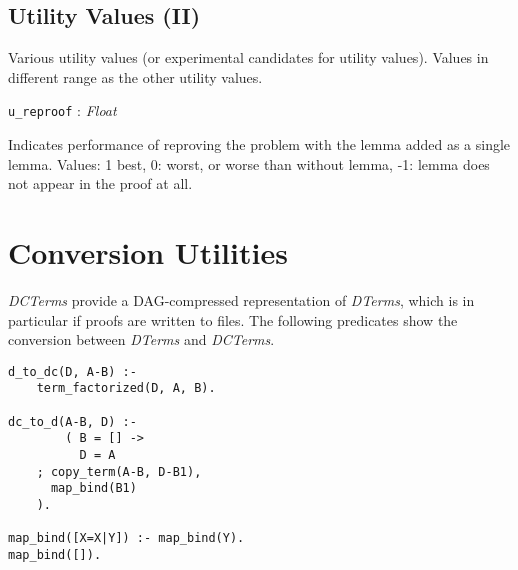 \documentclass[a4paper,11pt]{article}
\newcommand{\f}[1]{\texttt{#1}}
\newcommand{\var}[1]{\textnormal{\textit{#1}}}
\newcommand{\lit}[1]{\textnormal{\textit{#1}}}
\newcommand{\propsig}[2]
{\noindent \f{#1} : #2}
\newcommand{\propdesc}[1]
{\par \hspace*{\fill}\begin{minipage}{0.9\textwidth}#1\end{minipage}\par\smallskip}
\begin{document}
\subsection{Utility Values (II)}

Various utility values (or experimental candidates for utility values). Values
in different range as the other utility values.

\propsig{u\_reproof}{\lit{Float}}

\propdesc{Indicates performance of reproving the problem with the lemma added
  as a single lemma. Values: 1 best, 0: worst, or worse than without lemma,
  -1: lemma does not appear in the proof at all.}

\section{Conversion Utilities}
\label{sec-aux-utils}  

\var{DCTerms} provide a DAG-compressed representation of \var{DTerms}, which
is in particular if proofs are written to files. The following predicates show
the conversion between \var{DTerms} and \var{DCTerms}.

\begin{Verbatim}[fontsize=\small]
d_to_dc(D, A-B) :-
	term_factorized(D, A, B).

dc_to_d(A-B, D) :-
        ( B = [] ->
          D = A
	; copy_term(A-B, D-B1),
	  map_bind(B1)
	).

map_bind([X=X|Y]) :- map_bind(Y).
map_bind([]).
\end{Verbatim}
\end{document}
